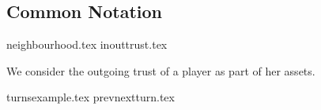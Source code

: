 \subsection{Common Notation}
  {neighbourhood.tex}
  {inouttrust.tex}

  We consider the outgoing trust of a player as part of her assets.

  {turnsexample.tex}
  {prevnextturn.tex}
